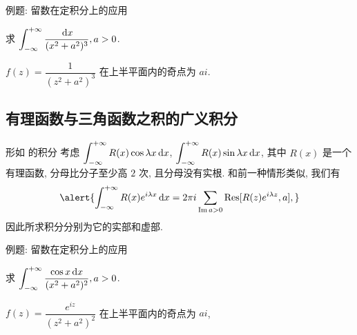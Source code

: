 \begin{frame}{例题: 留数在定积分上的应用}
	\onslide<+->
	\begin{example}
		求 $\displaystyle\int_{-\infty}^{+\infty}\frac{\,\mathrm{d} x}{(x^2+a^2)^3},a>0$.
	\end{example}

	\onslide<+->
	\begin{solution}
		$f(z)=\dfrac1{(z^2+a^2)^3}$ 在上半平面内的奇点为 $ai$.
		\vspace{-\baselineskip}
		\onslide<+->{故
			\[\int_{-\infty}^{+\infty}\frac{\diff x}{(x^2+a^2)^3}
		=2\pi i\Res[f(z),ai]=\frac{3\pi}{8a^5}.\]
		}
		\vspace{-\baselineskip}
	\end{solution}
\end{frame}


\subsection{有理函数与三角函数之积的广义积分}

\begin{frame}{形如  的积分}
	\onslide<+->
	考虑 $\displaystyle\int_{-\infty}^{+\infty}R(x)\cos{\lambda x}\,\mathrm{d} x$,
	$\displaystyle\int_{-\infty}^{+\infty}R(x)\sin{\lambda x}\,\mathrm{d} x$, 其中 $R(x)$ 是一个有理函数, 分母比分子至少高 $2$ 次, 且分母没有实根.
	\onslide<+->
	和前一种情形类似, 我们有
	\[\alert{\int_{-\infty}^{+\infty}R(x)e^{i\lambda x}\diff x
	=2\pi i\sum_{\Im a>0}\Res[R(z)e^{i\lambda z},a],}\]
	\onslide<+->
	因此所求积分分别为它的实部和虚部.
\end{frame}


\begin{frame}{例题: 留数在定积分上的应用}
	\beqskip{2pt}
	\onslide<+->
	\begin{example}
		求 $\displaystyle\int_{-\infty}^{+\infty}\frac{\cos x\,\mathrm{d} x}{(x^2+a^2)^2}, a>0$.
	\end{example}
	
	\onslide<+->
	\begin{solution}
		$f(z)=\dfrac{e^{iz}}{(z^2+a^2)^2}$ 在上半平面内的奇点为 $ai$,
		\onslide<+->{
			\[\Res[f(z),ai]=\lim_{z\to ai}\left[\frac{e^{iz}}{(z+ai)^2}\right]'=-\frac{e^{-a}(a+1)i}{4a^3}.\]
		}\onslide<+->{
			\[\int_{-\infty}^{+\infty}\frac{\cos x\diff x}{(x^2+a^2)^2}=\frac{\pi e^{-a}(a+1)}{2a^3}.\]
		}
	\end{solution}
	\endgroup
\end{frame}


